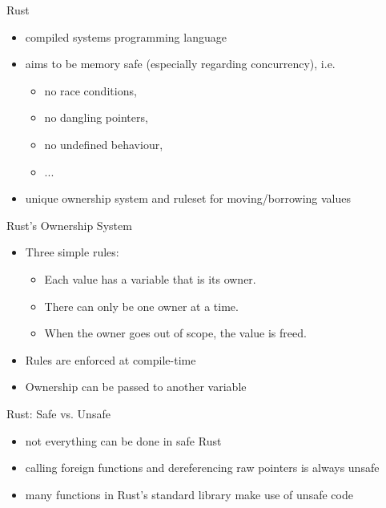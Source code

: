 \documentclass[NET,english,aspectratio=169,notitleframe]{tumbeamer}
\begin{document}
\begin{frame}{Rust}
\begin{itemize}
\item compiled systems programming language
\item aims to be memory safe (especially regarding concurrency), i.e.
\begin{itemize}
\item no race conditions,
\item no dangling pointers,
\item no undefined behaviour,
\item ...
\end{itemize}
\item unique ownership system and ruleset for moving/borrowing values
\end{itemize}
\end{frame}

\begin{frame}{Rust's Ownership System}
\begin{itemize}
\item Three simple rules:
\begin{itemize}
\item Each value has a variable that is its owner.
\item There can only be one owner at a time.
\item When the owner goes out of scope, the value is freed.
\end{itemize}
\item Rules are enforced at compile-time
\item Ownership can be passed to another variable%
\end{itemize}
\end{frame}

\begin{frame}{Rust: Safe vs. Unsafe}
\begin{itemize}
\item not everything can be done in safe Rust
\item calling foreign functions and dereferencing raw pointers is always unsafe
\item many functions in Rust's standard library make use of unsafe code
\end{itemize}
\end{frame}
\end{document}
